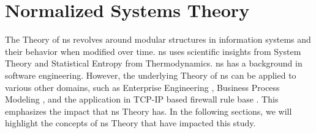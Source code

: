 \section{Normalized Systems Theory} \label{sec_ns_theory}

The Theory of \gls{ns} revolves around modular structures in information systems and their
behavior when modified over time. \gls{ns} uses scientific insights from System Theory and
Statistical Entropy from Thermodynamics. \gls{ns} has a background in software
engineering. However, the underlying Theory of \gls{ns} can be applied to various other
domains, such as Enterprise Engineering \parencite{huysmans_towards_2013}, Business
Process Modeling \parencite{van_nuel_towards_2011}, and the application in TCP-IP based
firewall rule base \parencite{haerens_evolvability_2021}. This emphasizes the impact that
\gls{ns} Theory has. In the following sections, we will highlight the concepts of
\gls{ns} Theory that have impacted this study.





